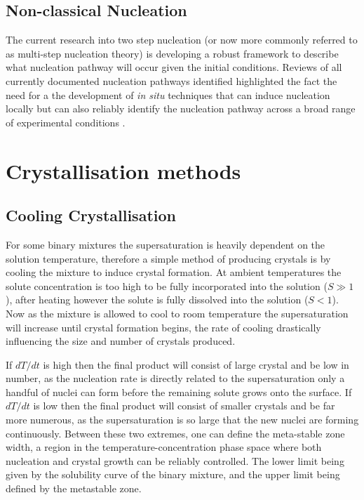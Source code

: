 \subsection{Non-classical Nucleation} 



The current research into two step nucleation (or now more commonly referred 
to as multi-step nucleation theory) is developing a robust framework to 
describe what nucleation pathway will occur given the initial conditions. 
Reviews of all currently documented nucleation pathways identified highlighted 
the fact the need for a the development of \textit{in situ} techniques that 
can induce nucleation locally but can also reliably identify the nucleation 
pathway across a broad range of experimental conditions \cite{Karthika2016, Fu2021}. 

\section{Crystallisation methods}
\subsection{Cooling Crystallisation}
For some binary mixtures the supersaturation is heavily dependent on 
the solution temperature, therefore a simple method of producing crystals 
is by cooling the mixture to induce crystal formation. At ambient 
temperatures the solute concentration is too high to be fully incorporated
into the solution ($S\gg 1$), after heating however the solute is fully 
dissolved into the solution ($S<1$). Now as the mixture is allowed to cool 
to room temperature the supersaturation will increase until crystal formation begins, the rate of cooling drastically influencing the size and number of crystals produced.

If $dT/dt$ is high then the final product will consist of large 
crystal and be low in number, as the nucleation rate is directly related
to the supersaturation only a handful of nuclei can form before the remaining
solute grows onto the surface. If $dT/dt$ is low then the final product will 
consist of smaller crystals and be far more numerous, as the supersaturation 
is so large that the new nuclei are forming continuously. Between these two 
extremes, one can define the meta-stable zone width, a region in the 
temperature-concentration phase space where both nucleation and crystal growth
can be reliably controlled. The lower limit being given by the solubility curve
of the binary mixture, and the upper limit being defined by the metastable zone.

